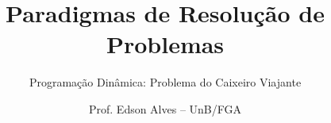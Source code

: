 \title{Paradigmas de Resolução de Problemas}
\subtitle{Programação Dinâmica: Problema do Caixeiro Viajante}
\author{Prof. Edson Alves -- UnB/FGA}
\date{}
